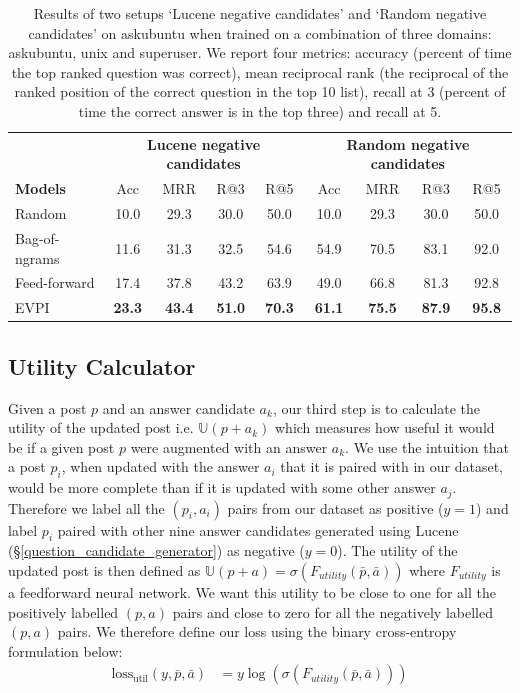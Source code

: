 \documentclass[11pt,a4paper]{article}
\newcommand{\U}{\mathbb{U}}
\begin{document}
\begin{table}[t]
	\small
	\centering
	\begin{tabular}{l|cccc|cccc}
		\toprule
		& \multicolumn{4}{c|}{\textbf{Lucene negative candidates}} & \multicolumn{4}{c}{\textbf{Random negative candidates}} \\
		\textbf{Models} & Acc & MRR & R@3 & R@5 & Acc & MRR & R@3 & R@5\\
		\midrule
		Random  & 10.0 & 29.3 & 30.0 & 50.0 &10.0 & 29.3 & 30.0 & 50.0 \\
		Bag-of-ngrams & 11.6 & 31.3 & 32.5 & 54.6 & 54.9 & 70.5 & 83.1 & 92.0 \\
		Feed-forward & 17.4 & 37.8 & 43.2 & 63.9 &  49.0 & 66.8 & 81.3 & 92.8 \\
		EVPI & \bf 23.3 & \bf 43.4 & \bf 51.0 & \bf 70.3 & \bf 61.1 & \bf 75.5 & \bf 87.9  & \bf 95.8  \\
		\bottomrule
	\end{tabular}
	\caption{\small Results of two setups `Lucene negative candidates' and `Random negative candidates' on askubuntu when trained on a combination of three domains: askubuntu, unix and superuser.  We report four metrics: accuracy (percent of time the top ranked question was correct),
		mean reciprocal rank (the reciprocal of the ranked position of the correct question in the top 10 list), recall at 3 (percent of time the correct answer is in the top three) and
		recall at 5.}
	\label{tab:results_topN}
	\vspace{-1.0em}
\end{table}

\subsection{Utility Calculator}\label{utility_calculator}
Given a post $p$ and an answer candidate $a_k$, our third step is to calculate the utility of the updated post i.e. $\U(p + a_k)$ which measures how useful it would be if a given post $p$ were augmented with an answer $a_k$. We use the intuition that a post $p_i$, when updated with the answer $a_i$ that it is paired with in our dataset, would be more complete than if it is updated with some other answer $a_j$. Therefore we label all the $(p_i, a_i)$ pairs from our dataset as positive ($y=1$) and label $p_i$ paired with other nine answer candidates generated using Lucene (\S\ref{question_candidate_generator}) as negative ($y=0$).  The utility of the updated post is then defined as $\U(p+a) = \sigma ( F_{utility}(\bar{p}, \bar{a}) )$ where $F_{utility}$ is a feedforward neural network. We want this utility to be close to one for all the positively labelled $(p,a)$ pairs and close to zero for all the negatively labelled $(p, a)$ pairs. We therefore define our loss using the binary cross-entropy formulation below:
\begin{align}\label{eq_utility_calculator}
\textrm{loss}_{\textrm{util}}(y, \bar p, \bar a) &= y \log(\sigma (F_{utility}(\bar{p}, \bar{a})))
\end{align}
\end{document}
